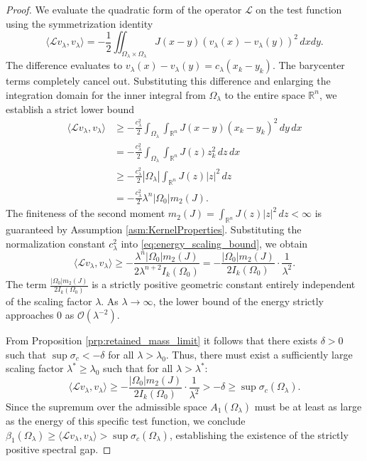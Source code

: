 \documentclass[12pt, a4paper]{article}
\theoremstyle{break}
\theoremstyle{break}
\theoremstyle{break}
\theoremstyle{break}
\theoremstyle{break}
\theoremstyle{break}
\theoremstyle{break}
\theoremstyle{break}
\theoremstyle{break}
\begin{document}
\begin{proof}
    We evaluate the quadratic form of the operator $\mathcal{L}$ on the test function using the symmetrization identity
    \begin{equation}
        \langle \mathcal{L}v_\lambda, v_\lambda \rangle = -\frac{1}{2} \iint_{\Omega_\lambda \times \Omega_\lambda} J(x-y) (v_\lambda(x) - v_\lambda(y))^2 \, dx dy.
    \end{equation}
    The difference evaluates to $v_\lambda(x) - v_\lambda(y) = c_\lambda(x_k - y_k)$. The barycenter terms completely cancel out. Substituting this difference and enlarging the integration domain for the inner integral from $\Omega_\lambda$ to the entire space $\mathbb{R}^n$, we establish a strict lower bound
    \begin{align} \label{eq:energy_scaling_bound}
        \langle \mathcal{L}v_\lambda, v_\lambda \rangle &\geq -\frac{c_\lambda^2}{2} \int_{\Omega_\lambda} \int_{\mathbb{R}^n} J(x-y) (x_k - y_k)^2 \, dy \, dx \nonumber \\
        &= -\frac{c_\lambda^2}{2} \int_{\Omega_\lambda} \int_{\mathbb{R}^n} J(z) z_k^2 \, dz \, dx \nonumber \\
        &\geq -\frac{c_\lambda^2}{2} |\Omega_\lambda| \int_{\mathbb{R}^n} J(z) |z|^2 \, dz \nonumber \\
        &= -\frac{c_\lambda^2}{2} \lambda^n |\Omega_0| m_2(J).
    \end{align}
    The finiteness of the second moment $m_2(J) = \int_{\mathbb{R}^n} J(z) |z|^2 \, dz < \infty$ is guaranteed by Assumption \ref{asm:KernelProperties}. Substituting the normalization constant $c_\lambda^2$ into \eqref{eq:energy_scaling_bound}, we obtain
    \begin{equation}
        \langle \mathcal{L}v_\lambda, v_\lambda \rangle \geq -\frac{\lambda^n |\Omega_0| m_2(J)}{2 \lambda^{n+2} I_k(\Omega_0)} = -\frac{|\Omega_0| m_2(J)}{2 I_k(\Omega_0)} \cdot \frac{1}{\lambda^2}.
    \end{equation}
    The term $\frac{|\Omega_0| m_2(J)}{2 I_k(\Omega_0)}$ is a strictly positive geometric constant entirely independent of the scaling factor $\lambda$. As $\lambda \to \infty$, the lower bound of the energy strictly approaches $0$ as $\mathcal{O}(\lambda^{-2})$. 
    
    From Proposition \ref{prp:retained_mass_limit} it follows that there exists $\delta > 0$ such that $\sup \sigma_c < - \delta$ for all $\lambda > \lambda_0$. Thus, there must exist a sufficiently large scaling factor $\lambda^* \geq \lambda_0$ such that for all $\lambda > \lambda^*$:
    \begin{equation}
        \langle \mathcal{L}v_\lambda, v_\lambda \rangle \geq -\frac{|\Omega_0| m_2(J)}{2 I_k(\Omega_0)} \cdot \frac{1}{\lambda^2} > -\delta \geq \sup \sigma_c(\Omega_\lambda).
    \end{equation}
    Since the supremum over the admissible space $A_1(\Omega_\lambda)$ must be at least as large as the energy of this specific test function, we conclude $\beta_1(\Omega_\lambda) \geq \langle \mathcal{L}v_\lambda, v_\lambda \rangle > \sup \sigma_c(\Omega_\lambda)$, establishing the existence of the strictly positive spectral gap.
\end{proof}
\end{document}
